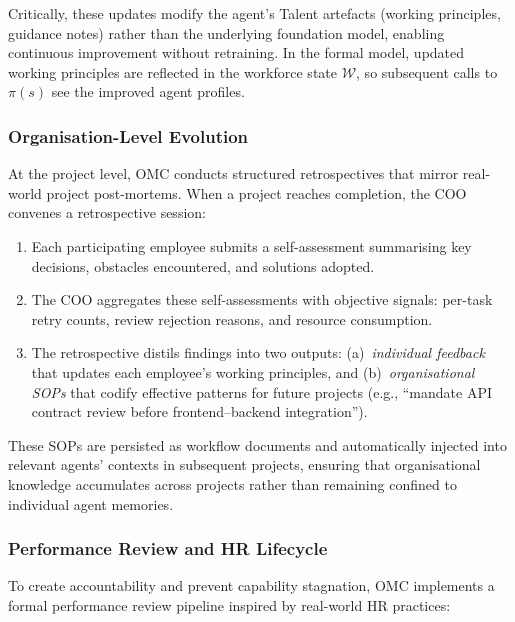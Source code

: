 \documentclass[11pt,a4paper]{article}
\begin{document}
Critically, these updates modify the agent's Talent artefacts (working principles, guidance notes) rather than the underlying foundation model, enabling continuous improvement without retraining.  In the formal model, updated working principles are reflected in the workforce state $\mathcal{W}$, so subsequent calls to $\pi(s)$ see the improved agent profiles.

\subsubsection{Organisation-Level Evolution}

At the project level, OMC conducts structured retrospectives that mirror real-world project post-mortems.  When a project reaches completion, the COO convenes a retrospective session:

\begin{enumerate}[nosep]
    \item Each participating employee submits a self-assessment summarising key decisions, obstacles encountered, and solutions adopted.
    \item The COO aggregates these self-assessments with objective signals: per-task retry counts, review rejection reasons, and resource consumption.
    \item The retrospective distils findings into two outputs: (a)~\emph{individual feedback} that updates each employee's working principles, and (b)~\emph{organisational SOPs} that codify effective patterns for future projects (e.g., ``mandate API contract review before frontend--backend integration'').
\end{enumerate}

These SOPs are persisted as workflow documents and automatically injected into relevant agents' contexts in subsequent projects, ensuring that organisational knowledge accumulates across projects rather than remaining confined to individual agent memories.

\subsubsection{Performance Review and HR Lifecycle}

To create accountability and prevent capability stagnation, OMC implements a formal performance review pipeline inspired by real-world HR practices:
\end{document}
